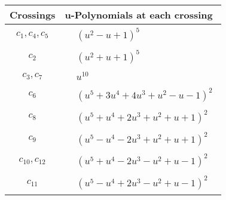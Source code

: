 \documentclass[1p]{elsarticle_modified}
\theoremstyle{definition}
\begin{document}
\begin{tabular}{m{50pt}|m{274pt}}
Crossings & \hspace{64pt}u-Polynomials at each crossing \\
\hline $$\begin{aligned}c_{1},c_{4},c_{5}\end{aligned}$$&$\begin{aligned}
&(u^2- u+1)^5
\end{aligned}$\\
\hline $$\begin{aligned}c_{2}\end{aligned}$$&$\begin{aligned}
&(u^2+u+1)^5
\end{aligned}$\\
\hline $$\begin{aligned}c_{3},c_{7}\end{aligned}$$&$\begin{aligned}
&u^{10}
\end{aligned}$\\
\hline $$\begin{aligned}c_{6}\end{aligned}$$&$\begin{aligned}
&(u^5+3 u^4+4 u^3+u^2- u-1)^2
\end{aligned}$\\
\hline $$\begin{aligned}c_{8}\end{aligned}$$&$\begin{aligned}
&(u^5+u^4+2 u^3+u^2+u+1)^2
\end{aligned}$\\
\hline $$\begin{aligned}c_{9}\end{aligned}$$&$\begin{aligned}
&(u^5- u^4-2 u^3+u^2+u+1)^2
\end{aligned}$\\
\hline $$\begin{aligned}c_{10},c_{12}\end{aligned}$$&$\begin{aligned}
&(u^5+u^4-2 u^3- u^2+u-1)^2
\end{aligned}$\\
\hline $$\begin{aligned}c_{11}\end{aligned}$$&$\begin{aligned}
&(u^5- u^4+2 u^3- u^2+u-1)^2
\end{aligned}$\\
\hline
\end{tabular}\\~\\
\end{document}
